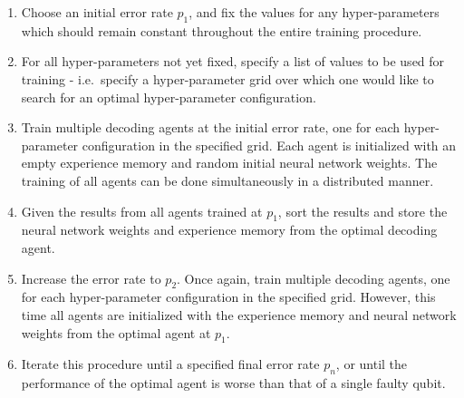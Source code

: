 \documentclass[twocolumn,preprintnumbers,amsmath,amssymb,notitlepage,nofootinbib,longbibliography,superscriptaddress,aps,pra,10pt]{revtex4-1}
\begin{document}
	\begin{enumerate}
		\item Choose an initial error rate $p_1$, and fix the values for any hyper-parameters which should remain constant throughout the entire training procedure.
		\item For all hyper-parameters not yet fixed, specify a list of values to be used for training - i.e.\ specify a hyper-parameter grid over which one would like to search for an optimal hyper-parameter configuration.
		\item Train multiple decoding agents at the initial error rate, one for each hyper-parameter configuration in the specified grid.
		Each agent is initialized with an empty experience memory and random initial neural network weights.
		The training of all agents can be done simultaneously in a distributed manner.
		\item Given the results from all agents trained at $p_1$, sort the results and store the neural network weights and experience memory from the optimal decoding agent.
		\item Increase the error rate to $p_2$.
		Once again, train multiple decoding agents, one for each hyper-parameter configuration in the specified grid.
		However, this time all agents are initialized with the experience memory and neural network weights from the optimal agent at $p_1$.
		\item Iterate this procedure until a specified final error rate $p_n$, or until the performance of the optimal agent is worse than that of a single faulty qubit.
	\end{enumerate}
\end{document}
